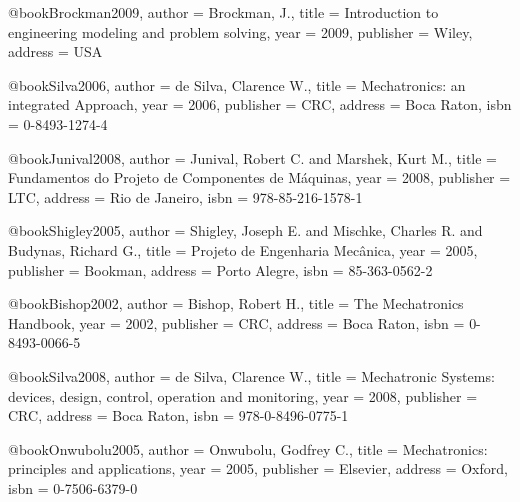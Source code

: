 
%

@book{Brockman2009,
  author = {Brockman, J.},
  title = {Introduction to engineering modeling and problem solving},
  year = {2009},
  publisher = {Wiley},
  address = {USA}
}

@book{Silva2006,
  author = {de Silva, Clarence W.},
  title = {Mechatronics: an integrated Approach},
  year = {2006},
  publisher = {CRC},
  address = {Boca Raton},
  isbn = {0-8493-1274-4}
}

@book{Junival2008,
  author = {Junival, Robert C. and Marshek, Kurt M.},
  title = {Fundamentos do Projeto de Componentes de Máquinas},
  year = {2008},
  publisher = {LTC},
  address = {Rio de Janeiro},
  isbn = {978-85-216-1578-1}
}

@book{Shigley2005,
  author = {Shigley, Joseph E. and Mischke, Charles R. and Budynas, Richard G.},
  title = {Projeto de Engenharia Mecânica},
  year = {2005},
  publisher = {Bookman},
  address = {Porto Alegre},
  isbn = {85-363-0562-2}
}

@book{Bishop2002,
  author = {Bishop, Robert H.},
  title = {The Mechatronics Handbook},
  year = {2002},
  publisher = {CRC},
  address = {Boca Raton},
  isbn = {0-8493-0066-5}
}

@book{Silva2008,
  author = {de Silva, Clarence W.},
  title = {Mechatronic Systems: devices, design, control, operation and monitoring},
  year = {2008},
  publisher = {CRC},
  address = {Boca Raton},
  isbn = {978-0-8496-0775-1}
}

@book{Onwubolu2005,
  author = {Onwubolu, Godfrey C.},
  title = {Mechatronics: principles and applications},
  year = {2005},
  publisher = {Elsevier},
  address = {Oxford},
  isbn = {0-7506-6379-0}
}

